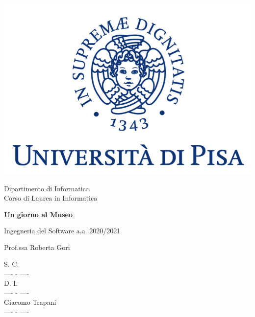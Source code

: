 \documentclass[10pt, italian, openany, landscape]{book}
\begin{document}
\begin{titlepage}
	\clearpage\thispagestyle{empty}
	\centering
	\vspace{1cm}

    \includegraphics[scale=0.60]{unipi-logo.png}
    
	{\normalsize \noindent Dipartimento di Informatica \\
	             Corso di Laurea in Informatica \par}
	
	\vspace{2cm}
	{\Huge \textbf{Un giorno al Museo} \par}
	\vspace{1cm}
	{\large Ingegneria del Software a.a. 2020/2021}

    \begin{minipage}[t]{0.47\textwidth}
    	{\large{ Prof.ssa Roberta Gori}}
    \end{minipage}\hfill\begin{minipage}[t]{0.47\textwidth}\raggedleft
        {\large {S. C. \\ ---- - ----\\ }}
        {\large {D. I. \\ ---- - ----\\ }}
    	{\large {Giacomo Trapani \\ ---- - ----\\ }}
    \end{minipage}

    \vspace{4cm}

	\pagebreak

\end{titlepage}
\end{document}
